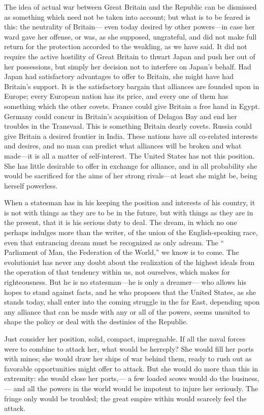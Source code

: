 \documentclass[11pt,openany]{book}
\begin{document}
The idea of actual war between Great Britain and the Republic can be dismissed as something which need not be taken into account; but what is to be feared is this: the neutrality of Britain--- even today desired by other powers---in case her ward gave her offense, or was, as she supposed, ungrateful, and did not make full return for the protection accorded to the weakling, as we have said. It did not require the active hostility of Great Britain to thwart Japan and push her out of her possessions, but simply her decision not to interfere on Japan's behalf. Had Japan had satisfactory advantages to offer to Britain, she might have had Britain's support. It is the satisfactory bargain that alliances are founded upon in Europe; every European nation has its price, and every one of them has something which the other covets. France could give Britain a free hand in Egypt. Germany could concur in Britain's acquisition of Delagoa Bay and end her troubles in the Transvaal. This is something Britain dearly covets. Russia could give Britain a desired frontier in India. These nations have all co-related interests and desires, and no man can predict what alliances will be broken and what made---it is all a matter of self-interest. The United States has not this position. She has little desirable to offer in exchange for alliance, and in all probability she would be sacrificed for the aims of her strong rivals---at least she might be, being herself powerless.

When a statesman has in his keeping the position and interests of his country, it is not with things as they are to be in the future, but with things as they are in the present, that it is his serious duty to deal. The dream, in which no one perhaps indulges more than the writer, of the union of the English-speaking race, even that entrancing dream must be recognized as only adream. The `` Parliament of Man, the Federation of the World,'' we know is to come. The evolutionist has never any doubt about the realization of the highest ideals from the operation of that tendency within us, not ourselves, which makes for righteousness. But he is no statesman---he is only a dreamer--- who allows his hopes to stand against facts, and he who proposes that the United States, as she stands today, shall enter into the coming struggle in the far East, depending upon any alliance that can be made with any or all of the powers, seems unsuited to shape the policy or deal with the destinies of the Republie.

Just consider her position, solid, compact, impregnable. If all the naval forces were to combine to attack her, what would be herreply? She would fill her ports with mines; she would draw her ships of war behind them, ready to rush out as favorable opportunities might offer to attack. But she would do more than this in extremity: she would close her ports,--- a few loaded scows would do the business,--- and all the powers in the world would be impotent to injure her seriously. The fringe only would be troubled; the great empire within would scarcely feel the attack.
\end{document}
